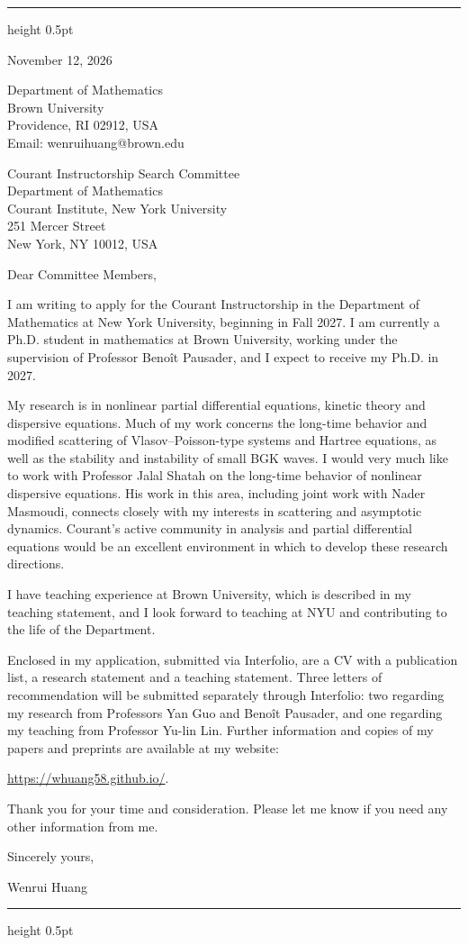 \documentclass[10pt]{article}
\begin{document}
\vspace{0.08in}
\hrule height 0.5pt

\vspace{0.47in}
\hfill
\begin{minipage}{2.27in}
November 12, 2026

\vspace{0.16in}
Department of Mathematics\\
Brown University\\
Providence, RI 02912, USA\\
Email: wenrui\textunderscore huang@brown.edu
\end{minipage}

\vspace{0.30in}
Courant Instructorship Search Committee\\
Department of Mathematics\\
Courant Institute, New York University\\
251 Mercer Street\\
New York, NY 10012, USA

\vspace{0.16in}
Dear Committee Members,

I am writing to apply for the Courant Instructorship in the Department of Mathematics at New York University, beginning in Fall 2027. I am currently a Ph.D. student in mathematics at Brown University, working under the supervision of Professor Beno\^{i}t Pausader, and I expect to receive my Ph.D. in 2027.

My research is in nonlinear partial differential equations, kinetic theory and dispersive equations. Much of my work concerns the long-time behavior and modified scattering of Vlasov--Poisson-type systems and Hartree equations, as well as the stability and instability of small BGK waves. I would very much like to work with Professor Jalal Shatah on the long-time behavior of nonlinear dispersive equations. His work in this area, including joint work with Nader Masmoudi, connects closely with my interests in scattering and asymptotic dynamics. Courant's active community in analysis and partial differential equations would be an excellent environment in which to develop these research directions.

I have teaching experience at Brown University, which is described in my teaching statement, and I look forward to teaching at NYU and contributing to the life of the Department.

Enclosed in my application, submitted via Interfolio, are a CV with a publication list, a research statement and a teaching statement. Three letters of recommendation will be submitted separately through Interfolio: two regarding my research from Professors Yan Guo and Beno\^{i}t Pausader, and one regarding my teaching from Professor Yu-lin Lin. Further information and copies of my papers and preprints are available at my website:

\url{https://whuang58.github.io/}.

\medskip
Thank you for your time and consideration. Please let me know if you need any other information from me.

\vspace{0.12in}
Sincerely yours,

\vspace{0.12in}
Wenrui Huang

\vfill
\hrule height 0.5pt
\end{document}

